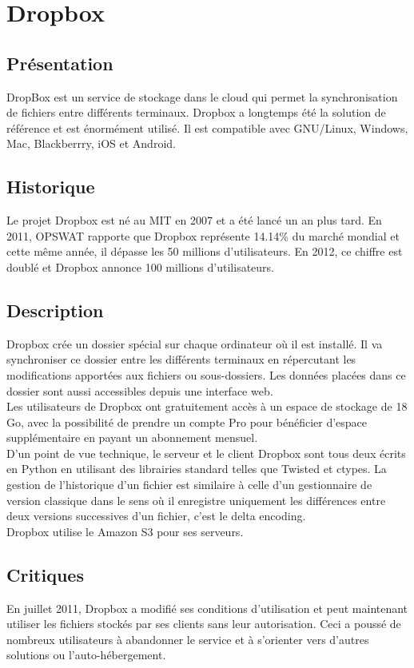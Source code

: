 \section{Dropbox}
\thispagestyle{EIP} %
\subsection{Présentation}
DropBox est un service de stockage dans le cloud qui permet la synchronisation de fichiers entre différents terminaux. Dropbox a longtemps été la solution de référence et est énormément utilisé. Il est compatible avec GNU/Linux, Windows, Mac, Blackberrry, iOS et Android.\\

\subsection{Historique}
Le projet Dropbox est né au MIT en 2007 et a été lancé un an plus tard. En 2011, OPSWAT rapporte que Dropbox représente 14.14\% du marché mondial et cette même année, il dépasse les 50 millions d'utilisateurs. En 2012, ce chiffre est doublé et Dropbox annonce 100 millions d'utilisateurs.\\

\subsection{Description}
Dropbox crée un dossier spécial sur chaque ordinateur où il est installé. Il va synchroniser ce dossier entre les différents terminaux en répercutant les modifications apportées aux fichiers ou sous-dossiers. Les données placées dans ce dossier sont aussi accessibles depuis une interface web.\\

Les utilisateurs de Dropbox ont gratuitement accès à un espace de stockage de 18 Go, avec la possibilité de prendre un compte Pro pour bénéficier d'espace supplémentaire en payant un abonnement mensuel.\\

D'un point de vue technique, le serveur et le client Dropbox sont tous deux écrits en Python en utilisant des librairies standard telles que Twisted et ctypes. La gestion de l'historique d'un fichier est similaire à celle d'un gestionnaire de version classique dans le sens où il enregistre uniquement les différences entre deux versions successives d'un fichier, c'est le delta encoding.\\

Dropbox utilise le Amazon S3 pour ses serveurs.\\

\subsection{Critiques}

En juillet 2011, Dropbox a modifié ses conditions d'utilisation et peut maintenant utiliser les fichiers stockés par ses clients sans leur autorisation. Ceci a poussé de nombreux utilisateurs à abandonner le service et à s'orienter vers d'autres solutions ou l'auto-hébergement.\\

